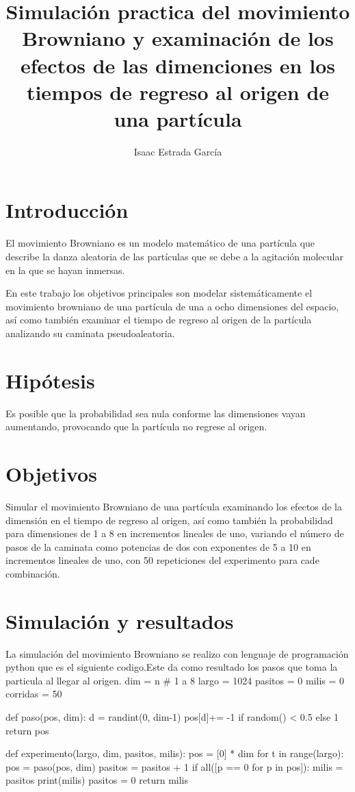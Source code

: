 \documentclass{article}
\title{Simulaci\'{o}n practica del movimiento Browniano y examinaci\'{o}n de los efectos de las dimenciones en los tiempos de regreso al origen de una part\'{i}cula}
\author{Isaac Estrada Garc\'{i}a }
\begin{document}
\maketitle

\section{Introducci\'{o}n}
El movimiento Browniano es un modelo matem\'{a}tico de una part\'{i}cula que describe la danza aleatoria de las part\'{i}culas que se debe a la agitaci\'{o}n molecular en la que se hayan inmersas.

En este trabajo los objetivos principales son modelar sistem\'{a}ticamente el movimiento browniano de una part\'{i}cula de una a ocho dimensiones del espacio, as\'{i} como tambi\'{e}n examinar el tiempo de regreso al origen de la part\'{i}cula analizando su caminata pseudoaleatoria.

\section{Hip\'{o}tesis}
Es posible que la probabilidad sea nula conforme las dimensiones vayan aumentando, provocando que la part\'{i}cula no regrese al origen.
\section{Objetivos}
Simular el movimiento Browniano de una part\'{i}cula examinando los efectos de la dimensi\'{o}n en el tiempo de regreso al origen, as\'{i} como tambi\'{e}n la probabilidad para dimensiones de 1 a 8 en incrementos lineales de uno, variando el n\'{u}mero de pasos de la caminata como potencias de dos con exponentes de 5 a 10 en incrementos lineales de uno, con 50 repeticiones del experimento para cade combinaci\'{o}n. 
\section{Simulaci\'{o}n y resultados}

La simulaci\'{o}n del movimiento Browniano se realizo con lenguaje de programaci\'{o}n python que es el siguiente codigo.Este da como resultado los pasos que toma la particula al llegar al origen.
dim = n # 1 a 8
largo = 1024
pasitos = 0
milis = 0
corridas = 50

def paso(pos, dim):
    d = randint(0, dim-1)
    pos[d]+= -1 if random() < 0.5 else 1
    return pos

def experimento(largo, dim, pasitos, milis):
    pos = [0] * dim
    for t in range(largo):
        pos = paso(pos, dim)
        pasitos = pasitos + 1
        if  all([p == 0 for p in pos]):
            milis = pasitos
            print(milis)
            pasitos = 0
    return milis
\end{document}
